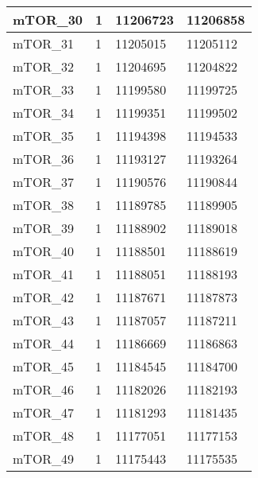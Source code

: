 \begin{longtable}{| p{} | C{.10\textwidth} | C{.35\textwidth} | C{.35\textwidth} |}
mTOR\_30                & 1            & 11206723              & 11206858            \\ \hline
mTOR\_31                & 1            & 11205015              & 11205112            \\ \hline
mTOR\_32                & 1            & 11204695              & 11204822            \\ \hline
mTOR\_33                & 1            & 11199580              & 11199725            \\ \hline
mTOR\_34                & 1            & 11199351              & 11199502            \\ \hline
mTOR\_35                & 1            & 11194398              & 11194533            \\ \hline
mTOR\_36                & 1            & 11193127              & 11193264            \\ \hline
mTOR\_37                & 1            & 11190576              & 11190844            \\ \hline
mTOR\_38                & 1            & 11189785              & 11189905            \\ \hline
mTOR\_39                & 1            & 11188902              & 11189018            \\ \hline
mTOR\_40                & 1            & 11188501              & 11188619            \\ \hline
mTOR\_41                & 1            & 11188051              & 11188193            \\ \hline
mTOR\_42                & 1            & 11187671              & 11187873            \\ \hline
mTOR\_43                & 1            & 11187057              & 11187211            \\ \hline
mTOR\_44                & 1            & 11186669              & 11186863            \\ \hline
mTOR\_45                & 1            & 11184545              & 11184700            \\ \hline
mTOR\_46                & 1            & 11182026              & 11182193            \\ \hline
mTOR\_47                & 1            & 11181293              & 11181435            \\ \hline
mTOR\_48                & 1            & 11177051              & 11177153            \\ \hline
mTOR\_49                & 1            & 11175443              & 11175535            \\ \hline

\end{longtable}
